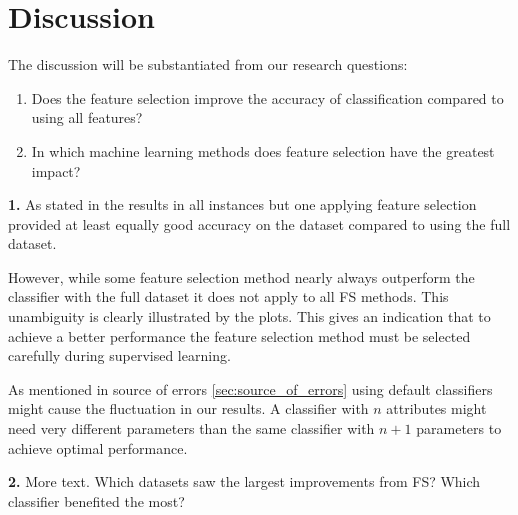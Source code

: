 \chapter{Discussion}


The discussion will be substantiated from our research questions:

\begin{enumerate}
  \item Does the feature selection improve the accuracy of classification compared to using all features?
  \item In which machine learning methods does feature selection have the greatest impact?
\end{enumerate}

\textbf{1.} As stated in the results in all instances but one applying feature selection provided at least equally good accuracy on the dataset compared to using the full dataset.

However, while some feature selection method nearly always outperform the classifier with the full dataset it does not apply to all FS methods. This unambiguity is clearly illustrated by the plots. This gives an indication that to achieve a better performance the feature selection method must be selected carefully during supervised learning.

As mentioned in source of errors \ref{sec:source_of_errors} using default classifiers might cause the fluctuation in our results. A classifier with $n$ attributes might need very different parameters than the same classifier with $n + 1$ parameters to achieve optimal performance.

\textbf{2.} More text. Which datasets saw the largest improvements from FS? Which classifier benefited the most?

